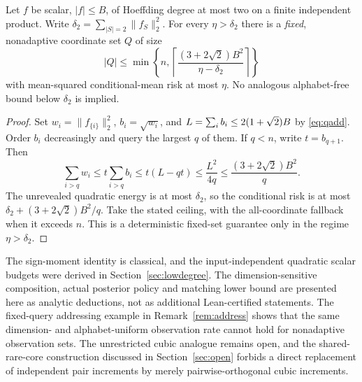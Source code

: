 \begin{proposition}\label{prop:fixedbudget}
Let $f$ be scalar, $|f|\le B$, of Hoeffding degree at most two on a finite independent product. Write $\delta_2=\sum_{|S|=2}\|f_S\|_2^2$. For every $\eta>\delta_2$ there is a \emph{fixed}, nonadaptive coordinate set $Q$ of size
\begin{equation}\label{eq:fixedbudget}
 |Q|\le\min\left\{n,\left\lceil\frac{(3+2\sqrt2)B^2}{\eta-\delta_2}\right\rceil\right\}
\end{equation}
with mean-squared conditional-mean risk at most $\eta$. No analogous alphabet-free bound below $\delta_2$ is implied.
\end{proposition}
\begin{proof}
Set $w_i=\|f_{\{i\}}\|_2^2$, $b_i=\sqrt{w_i}$, and $L=\sum_i b_i\le2(1+\sqrt2) B$ by \eqref{eq:qadd}. Order $b_i$ decreasingly and query the largest $q$ of them. If $q<n$, write $t=b_{q+1}$. Then
\[
 \sum_{i>q}w_i\le t\sum_{i>q}b_i\le t(L-qt)
 \le\frac{L^2}{4q}\le\frac{(3+2\sqrt2)B^2}{q}.
\]
The unrevealed quadratic energy is at most $\delta_2$, so the conditional risk is at most $\delta_2+(3+2\sqrt2)B^2/q$. Take the stated ceiling, with the all-coordinate fallback when it exceeds $n$. This is a deterministic fixed-set guarantee only in the regime $\eta>\delta_2$.
\end{proof}

\begin{remark}
The sign-moment identity is classical, and the input-independent quadratic scalar budgets were derived in Section~\ref{sec:lowdegree}. The dimension-sensitive composition, actual posterior policy and matching lower bound are presented here as analytic deductions, not as additional Lean-certified statements. The fixed-query addressing example in Remark~\ref{rem:address} shows that the same dimension- and alphabet-uniform observation rate cannot hold for nonadaptive observation sets. The unrestricted cubic analogue remains open, and the shared-rare-core construction discussed in Section~\ref{sec:open} forbids a direct replacement of independent pair increments by merely pairwise-orthogonal cubic increments.
\end{remark}
